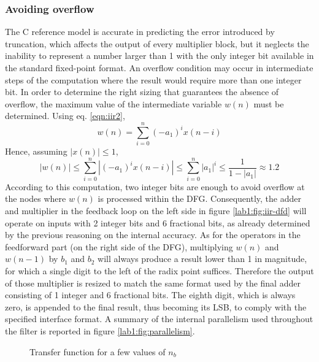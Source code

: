 \subsubsection{Avoiding overflow}
 The C reference model is accurate in predicting the error introduced by truncation, which affects the output of every multiplier block, but it neglects the inability to represent a number larger than 1 with the only integer bit available in the standard fixed-point format. An overflow condition may occur in intermediate steps of the computation where the result would require more than one integer bit. In order to determine the right sizing that guarantees the absence of overflow, the maximum value of the intermediate variable $w(n)$ must be determined. Using eq. \ref{eqn:iir2},
\begin{equation*}
w(n) = \sum_{i=0}^{n} (-a_1)^i x(n-i)
\end{equation*}
Hence, assuming $|x(n)|\leq 1$,
\begin{equation*}
|w(n)|\leq \sum_{i=0}^{n} |(-a_1)^i x(n-i)| \leq \sum_{i=0}^{n} |a_1|^i \leq \frac{1}{1-|a_1|} \approx 1.2 
\end{equation*}
According to this computation, two integer bits are enough to avoid overflow at the nodes where $w(n)$ is processed within the DFG. Consequently, the adder and multiplier in the feedback loop on the left side in figure \ref{lab1:fig:iir-dfd} will operate on inputs with 2 integer bits and 6 fractional bits, as already determined by the previous reasoning on the internal accuracy. 
As for the operators in the feedforward part (on the right side of the DFG), multiplying $w(n)$ and $w(n-1)$ by $b_1$ and $b_2$ will always produce a result lower than 1 in magnitude, for which a single digit to the left of the radix point suffices. Therefore the output of those multiplier is resized to match the same format used by the final adder consisting of 1 integer and 6 fractional bits. The eighth digit, which is always zero, is appended to the final result, thus becoming its LSB, to comply with the specified interface format. A summary of the internal parallelism used throughout the filter is reported in figure \ref{lab1:fig:parallelism}.
\begin{figure}
	\caption{Transfer function for a few values of $n_b$}
	\label{fig:tfcomparison}
\end{figure}
